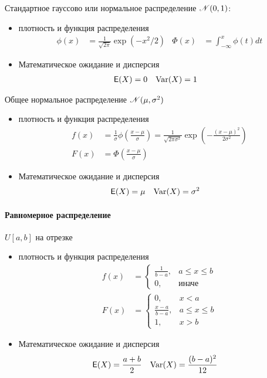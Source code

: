 Стандартное гауссово или нормальное распределение \({\mathscr N}(0,1)\):
\begin{itemize}
	\item плотность и функция распределения
	\begin{align*}
		\phi(x)&=\frac{1}{\sqrt{2\pi}}\exp(-x^2/2) &
		\Phi(x)&=\int^x_{-\infty}\phi(t)dt
	\end{align*}
	\item Математическое ожидание и дисперсия
	\begin{align*}
		{\mathsf E}(X)&=0 & \operatorname{Var}(X)&=1
	\end{align*}
\end{itemize}
Общее нормальное распределение \({\mathscr N}(\mu,\sigma^2)\)
\begin{itemize}
	\item плотность и функция распределения
	\begin{align*}
		f(x)&=\frac{1}{\sigma}\phi\left(\frac{x-\mu}{\sigma}\right)=
		\frac{1}{\sqrt{2\pi\sigma^2}}\exp\left(-\frac{(x-\mu)^2}{2\sigma^2}\right) \\
		F(x)&=\Phi\left(\frac{x-\mu}{\sigma}\right)
	\end{align*}
	\item Математическое ожидание и дисперсия
	\begin{align*}
		{\mathsf E}(X)&=\mu & \operatorname{Var}(X)&=\sigma^2
	\end{align*}
\end{itemize}

\paragraph{Равномерное распределение} \(U[a,b]\) на отрезке
\begin{itemize}
	\item плотность и функция распределения
	\begin{align*}
		f(x)&=\begin{cases}
			\frac{1}{b-a}, & a\leq x\leq b\\
			0, & \text{иначе}
		\end{cases} \\
		F(x)&=\begin{cases}
			0, & x< a\\
			\frac{x-a}{b-a}, & a\leq x\leq b\\
			1, & x>b
		\end{cases}
	\end{align*}
	\item Математическое ожидание и дисперсия
	\begin{align*}
		{\mathsf E}(X)&=\frac{a+b}{2} & \operatorname{Var}(X)&=\frac{(b-a)^2}{12}
	\end{align*}
\end{itemize}

